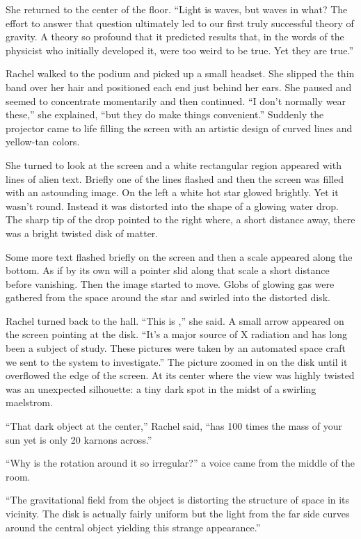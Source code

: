 She returned to the center of the floor. ``Light is waves, but waves in what? The effort to
answer that question ultimately led to our first truly successful theory of gravity. A theory
so profound that it predicted results that, in the words of the physicist who initially
developed it, were too weird to be true. Yet they are true.''

Rachel walked to the podium and picked up a small headset. She slipped the thin band over her
hair and positioned each end just behind her ears. She paused and seemed to concentrate
momentarily and then continued. ``I don't normally wear these,'' she explained, ``but they do
make things convenient.'' Suddenly the projector came to life filling the screen with an
artistic design of curved lines and yellow-tan colors.

She turned to look at the screen and a white rectangular region appeared with lines of alien
text. Briefly one of the lines flashed and then the screen was filled with an astounding image.
On the left a white hot star glowed brightly. Yet it wasn't round. Instead it was distorted into
the shape of a glowing water drop. The sharp tip of the drop pointed to the right where, a short
distance away, there was a bright twisted disk of matter.

Some more text flashed briefly on the screen and then a scale appeared along the bottom. As if
by its own will a pointer slid along that scale a short distance before vanishing. Then the
image started to move. Globs of glowing gas were gathered from the space around the star and
swirled into the distorted disk.

Rachel turned back to the hall. ``This is ,'' she said. A small arrow appeared
on the screen pointing at the disk. ``It's a major source of X radiation and has long been a
subject of study. These pictures were taken by an automated space craft we sent to the system to
investigate.'' The picture zoomed in on the disk until it overflowed the edge of the screen. At
its center where the view was highly twisted was an unexpected silhouette: a tiny dark spot in
the midst of a swirling maelstrom.

``That dark object at the center,'' Rachel said, ``has 100 times the mass of your sun yet is
only 20 karnons across.''

``Why is the rotation around it so irregular?'' a voice came from the middle of the room.

``The gravitational field from the object is distorting the structure of space in its vicinity.
The disk is actually fairly uniform but the light from the far side curves around the central
object yielding this strange appearance.''

